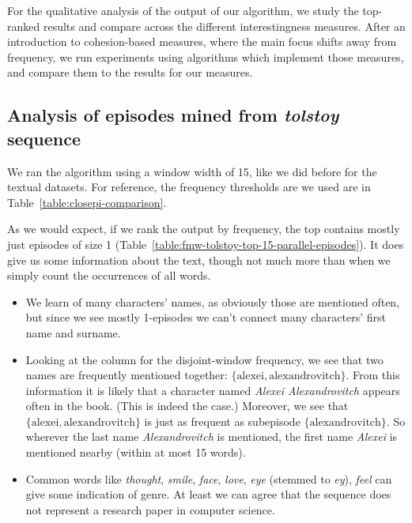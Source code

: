 For the qualitative analysis of the output of our algorithm, we study the top-ranked results and compare across the different interestingness measures. After an introduction to cohesion-based measures, where the main focus shifts away from frequency, we run experiments using algorithms which implement those measures, and compare them to the results for our measures.


\subsection{Analysis of episodes mined from \emph{tolstoy} sequence}
\label{sec:experiments-quality-episodes}

We ran the algorithm using a window width of 15, like we did before for the textual datasets. For reference, the frequency thresholds are we used are in Table~\ref{table:closepi-comparison}.

As we would expect, if we rank the output by frequency, the top contains mostly just episodes of size 1 (Table~\ref{table:fmw-tolstoy-top-15-parallel-episodes}). It does give us some information about the text, though not much more than when we simply count the occurrences of all words.

\begin{itemize}
\item We learn of many characters' names, as obviously those are mentioned often, but since we see mostly 1-episodes we can't connect many characters' first name and surname.
\item Looking at the column for the disjoint-window frequency, we see that two names are frequently mentioned together: $ \{ \text{alexei}, \text{alexandrovitch} \} $. From this information it is likely that a character named \emph{Alexei Alexandrovitch} appears often in the book. (This is indeed the case.) Moreover, we see that $ \{ \text{alexei}, \text{alexandrovitch} \} $ is just as frequent as subepisode $ \{ \text{alexandrovitch} \} $. So wherever the last name \emph{Alexandrovitch} is mentioned, the first name \emph{Alexei} is mentioned nearby (within at most 15 words).
\item Common words like \emph{thought}, \emph{smile}, \emph{face}, \emph{love}, \emph{eye} (stemmed to \emph{ey}), \emph{feel} can give some indication of genre. At least we can agree that the sequence does not represent a research paper in computer science.
\end{itemize}

